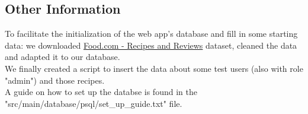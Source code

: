 \subsection{Other Information}



To facilitate the initialization of the web app's database and fill in some starting data: we downloaded \href{https://www.kaggle.com/datasets/irkaal/foodcom-recipes-and-reviews}{Food.com - Recipes and Reviews} dataset, cleaned the data and adapted it to our database.\\
We finally created a script to insert the data about some test users (also with role "admin") and those recipes.\\
A guide on how to set up the databse is found in the "src/main/database/psql/set\_up\_guide.txt" file.

